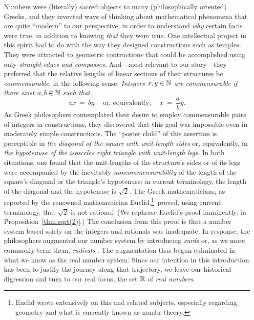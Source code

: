 Numbers were (literally) sacred objects to many (philosophically
oriented) Greeks, and they invented ways of thinking about
mathematical phenomena that are quite ``modern'' to our perspective,
in order to understand {\em why} certain facts were true, in addition
to knowing {\em that} they were true.  One intellectual project in
this spirit had to do with the way they designed constructions such as
temples.  They were attracted to geometric contructions that could be
accomplished using only {\em straight-edges and compasses}.
And---most relevant to our story---they preferred that the relative
lengths of linear sections of their structures be {\em commensurable},
 in the
following sense.  {\em Integers $x,y \in \mathbb{N}$ are {\em commensurable}
  if there exist $a, b \in \mathbb{N}$ such that}
\[ 
ax \ = \ by \ \ \ \ \mbox{ or, equivalently, } \ \ \ \ x \ = \ \frac{a}{b} y.
\]
As Greek philosophers contemplated their desire to employ
commensurable pairs of integers in constructions, they discovered that
this goal was impossible even in moderately simple constructions.  The
``poster child'' of this assertion is perceptible in {\it the diagonal
  of the square with unit-length sides} or, equivalently, in {\it the
  hypotenuse of the isosceles right triangle with unit-length legs}.
In both situations, one found that the unit lengths of the structure's
sides or of its legs were accompanied by the inevitably {\em
  noncommensurability} of the length of the square's diagonal or the
triangle's hypotenuse; in current terminology, the length of the
diagonal and the hypotenuse is $\sqrt{2}$.  The Greek mathematicians,
as reported by the renowned mathematician
Euclid,\footnote{Euclid wrote extensively on this and related
  subjects, especially regarding geometry and what is currently known
  as numbr theory.}~proved, using current terminology, that $\sqrt{2}$
is not rational.  (We rephrase Euclid's proof imminently, in
Proposition~\ref{thm:sqrt(2)}.)  The conclusion from this proof is
that a number system based solely on the integers and rationals was
inadequate.  In response, the philosophers augmented our number system
by introducing {\it surds}  or, as we more commonly
term them, {\it radicals} .  The augmentation
thus begun culminated in what we know as the real number system.
Since our intention in this introduction has been to justify the
journey along that trajectory, we leave our historical digression and
turn to our real focus, the set $\mathbb{R}$ of {\it real numbers}.

